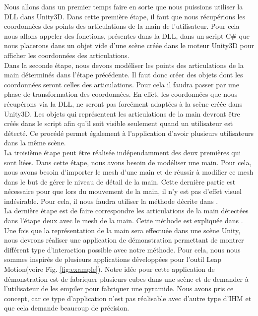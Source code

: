 Nous allons dans un premier temps faire en sorte que nous puissions utiliser la DLL dans Unity3D.
Dans cette première étape, il faut que nous récupérions les coordonnées des points des articulations
de la main de l'utilisateur. Pour cela nous allons appeler des fonctions, présentes dans la DLL, dans un 
script C\# que nous placerons dans un objet vide d'une scène créée dans le moteur Unity3D pour
afficher les coordonnées des articulations.\\

Dans la seconde étape, nous devons modéliser les points des articulations de la main déterminés 
dans l'étape précédente. Il faut donc créer des objets dont les coordonnées seront celles des articulations.
Pour cela il faudra passer par une phase de transformation des coordonnées. En effet, les coordonnées
que nous récupérons via la DLL, ne seront pas forcément adaptées à la scène créée dans Unity3D. Les 
objets qui représentent les articulations de la main devront être créés dans le script afin qu'il 
soit visible seulement quand un utilisateur est détecté. Ce procédé permet également à l'application
d'avoir plusieurs utilisateurs dans la même scène.\\

La troisième étape peut être réalisée indépendamment des deux premières qui sont liées. Dans cette étape,
nous avons besoin de modéliser une main. Pour cela, nous avons besoin d'importer le mesh d'une main et
de réussir à modifier ce mesh dans le but de gérer le niveau de détail de la main. Cette dernière
partie est nécessaire pour que lors du mouvement de la main, il n'y est pas d'effet visuel indésirable.
Pour cela, il nous faudra utiliser la méthode décrite dans \cite{export:217428}.\\

La dernière étape est de faire correspondre les articulations de la main détectées dans l'étape deux avec
le mesh de la main. Cette méthode est expliquée dans \cite{export:217428}.\\

Une fois que la représentation de la main sera effectuée dans une scène Unity, nous devrons réaliser une 
application de démonstration permettant de montrer différent type d'interaction possible avec notre 
méthode. Pour cela, nous nous sommes inspirés de plusieurs applications développées pour l'outil
Leap Motion(voire Fig. \ref{fig:example}). Notre idée pour cette application de démonstration est de fabriquer plusieurs cubes dans 
une scène et de demander à l'utilisateur de les empiler pour fabriquer une pyramide. Nous avons pris
ce concept, car ce type d'application n'est pas réalisable avec d'autre type d'IHM et que cela demande
beaucoup de précision.

